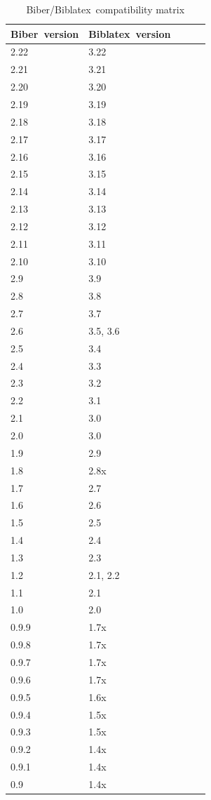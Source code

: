 \documentclass{ltxdockit}
\newcommand*{\biber}{Biber\xspace}
\newcommand*{\biblatex}{Biblatex\xspace}
\begin{document}
\begin{table}
\begin{center}
\small
\begin{tabular}{lllll}
\toprule
\biber\ version & \biblatex\ version\\
\midrule
2.22 & 3.22\\
2.21 & 3.21\\
2.20 & 3.20\\
2.19 & 3.19\\
2.18 & 3.18\\
2.17 & 3.17\\
2.16 & 3.16\\
2.15 & 3.15\\
2.14 & 3.14\\
2.13 & 3.13\\
2.12 & 3.12\\
2.11 & 3.11\\
2.10 & 3.10\\
2.9 & 3.9\\
2.8 & 3.8\\
2.7 & 3.7\\
2.6 & 3.5, 3.6\\
2.5 & 3.4\\
2.4 & 3.3\\
2.3 & 3.2\\
2.2 & 3.1\\
2.1 & 3.0\\
2.0 & 3.0\\
1.9 & 2.9\\
1.8 & 2.8x\\
1.7 & 2.7\\
1.6 & 2.6\\
1.5 & 2.5\\
1.4 & 2.4\\
1.3 & 2.3\\
1.2 & 2.1, 2.2\\
1.1 & 2.1\\
1.0 & 2.0\\
0.9.9 & 1.7x\\
0.9.8 & 1.7x\\
0.9.7 & 1.7x\\
0.9.6 & 1.7x\\
0.9.5 & 1.6x\\
0.9.4 & 1.5x\\
0.9.3 & 1.5x\\
0.9.2 & 1.4x\\
0.9.1 & 1.4x\\
0.9 & 1.4x\\
\bottomrule
\end{tabular}
\end{center}
\caption{\biber/\biblatex\ compatibility matrix}
\label{tab:compat}
\end{table}
\end{document}
